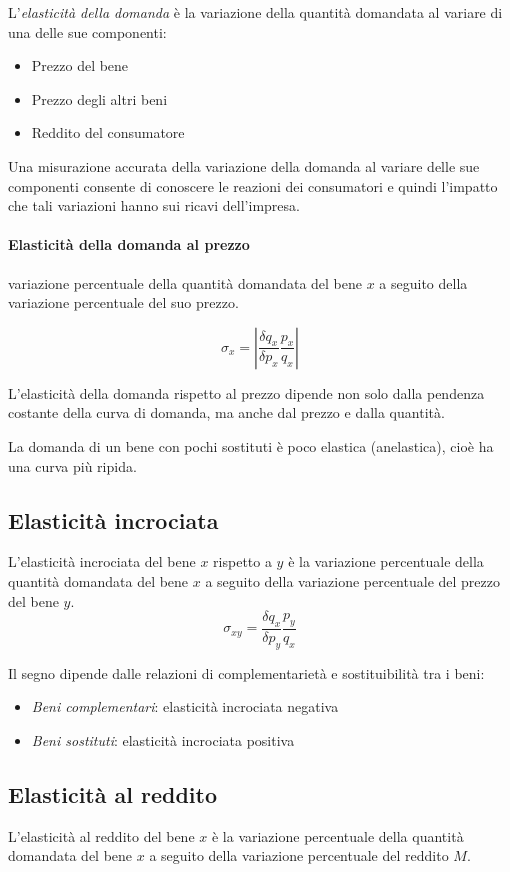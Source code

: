 L'\emph{elasticità della domanda} è la variazione della quantità domandata al variare di una delle sue componenti:
\begin{itemize}
	\item Prezzo del bene
	\item Prezzo degli altri beni
	\item Reddito del consumatore
\end{itemize}

Una misurazione accurata della variazione della domanda al variare delle sue componenti consente di
conoscere le reazioni dei consumatori e quindi l’impatto che tali variazioni hanno sui ricavi dell’impresa.

\paragraph{Elasticità della domanda al prezzo} variazione percentuale della quantità domandata del bene $x$ a
seguito della variazione percentuale del suo prezzo.

\[
\sigma_x = \left| \frac{\delta q_x}{\delta p_x} \frac{p_x}{q_x} \right| 
\]

L’elasticità della domanda rispetto al prezzo dipende non solo dalla pendenza costante della curva
di domanda, ma anche dal prezzo e dalla quantità.

La domanda di un bene con pochi sostituti è poco elastica (anelastica), cioè ha una curva più ripida.

\subsection{Elasticità incrociata}
L'elasticità incrociata del bene $x$ rispetto a $y$ è la variazione percentuale della quantità domandata del bene $x$ a
seguito della variazione percentuale del prezzo del bene $y$.
\[
\sigma_{xy} = \frac{\delta q_x}{\delta p_y} \frac{p_y}{q_x}
\]

Il segno dipende dalle relazioni di complementarietà e sostituibilità tra i beni:
\begin{itemize}
	\item \emph{Beni complementari}: elasticità incrociata negativa
	\item \emph{Beni sostituti}: elasticità incrociata positiva
\end{itemize}

\subsection{Elasticità al reddito}
L'elasticità al reddito del bene $x$ è la variazione percentuale della quantità domandata del bene $x$ a seguito della
variazione percentuale del reddito $M$.

